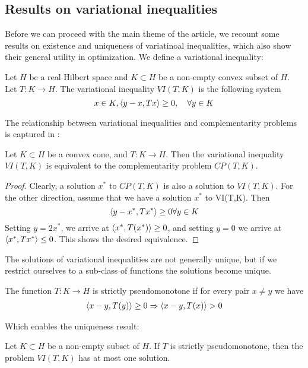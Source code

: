 \subsection{Results on variational inequalities}
Before we can proceed with the main theme of the article, we recount some results on existence and uniqueness of variatinoal inequalities, which also show their general utility in optimization.
We define a variational inequality:
\begin{definition}
  Let $H$ be a real Hilbert space and $K\subset H$ be a non-empty convex subset of $H$. Let $T: K \to H$. The variational inequality $VI(T,K)$ is the following system
  \begin{equation}
    x \in K, \left \langle y-x,Tx \right \rangle \geq 0, \quad \forall y \in K
  \end{equation}
\end{definition}
The relationship between variational inequalities and complementarity problems is captured in \citep[Proposition 12.1]{hadjisavvas2006handbook}:
\begin{proposition}
  \label{prop:VI_CP_eq}
  Let $K\subset H$ be a convex cone, and $T: K \to H$. Then the variational inequality $VI(T,K)$ is equivalent to the complementarity problem $CP(T,K)$.
\end{proposition}
\begin{proof}
  Clearly, a solution $x^*$ to $CP(T,K)$ is also a solution to $VI(T,K)$. For the other direction, assume that we have a solution $x^*$ to VI(T,K). Then
  \begin{equation}
    \left \langle y - x^*,Tx^* \right \rangle \geq 0 \forall y \in K
  \end{equation}
  Setting $y = 2x^*$, we arrive at $\left \langle x^*,T(x^*) \right \rangle \geq 0$, and setting $y=0$ we arrive at $\left \langle x^*,Tx^* \right \rangle \leq 0$. This shows the desired equivalence.
\end{proof}
The solutions of variational inequalities are not generally unique, but if we restrict ourselves to a sub-class of functions the solutions become unique.
\begin{definition}
  \label{def:strict_pm}
 The function $T: K \to H$ is strictly pseudomonotone if for every pair $x\neq y$ we have
 \begin{align}
   \left \langle x-y,T(y) \right \rangle \geq 0 \Rightarrow \left \langle x-y,T(x) \right \rangle > 0
 \end{align}
\end{definition}
Which enables the uniqueness result:
\begin{theorem}
  \label{thm:uniqueness}
  Let $K\subset H$ be a non-empty subset of $H$. If $T$ is strictly pseudomonotone, then the problem $VI(T,K)$ has at most one solution.
\end{theorem}
